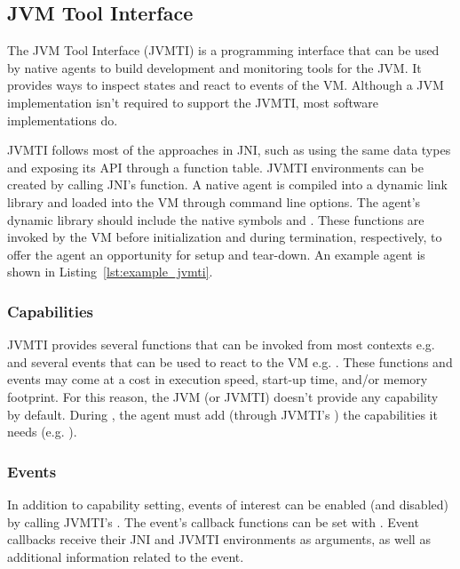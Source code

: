
\subsection{JVM Tool Interface}

The JVM Tool Interface (JVMTI) is a programming interface that can be used by native agents to build development and monitoring tools for the JVM. It provides ways to inspect states and react to events of the VM. Although a JVM implementation isn't required to support the JVMTI, most software implementations do.

JVMTI follows most of the approaches in JNI, such as using the same data types and exposing its API through a function table. JVMTI environments can be created by calling JNI's \href{https://docs.oracle.com/en/java/javase/11/docs/specs/jni/invocation.html#getenv}{} function. A native agent is compiled into a dynamic link library and loaded into the VM through command line options. The agent's dynamic library should include the native symbols  and . These functions are invoked by the VM before initialization and during termination, respectively, to offer the agent an opportunity for setup and tear-down. An example agent is shown in Listing~\ref{lst:example_jvmti}.

\subsubsection*{Capabilities}

JVMTI provides several functions that can be invoked from most contexts e.g.  and several events that can be used to react to the VM e.g. . These functions and events may come at a cost in execution speed, start-up time, and/or memory footprint. For this reason, the JVM (or JVMTI) doesn't provide any capability by default. During , the agent must add (through JVMTI's ) the capabilities it needs (e.g. ).

\subsubsection*{Events}

In addition to capability setting, events of interest can be enabled (and disabled) by calling JVMTI's . The event's callback functions can be set with . Event callbacks receive their JNI and JVMTI environments as arguments, as well as additional information related to the event.

